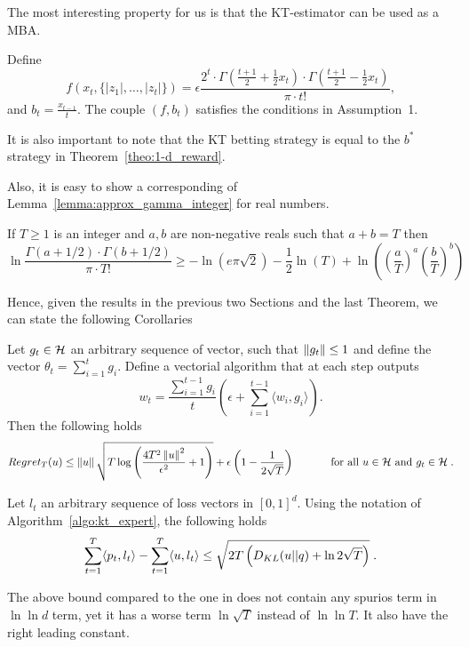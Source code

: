 The most interesting property for us is that the \ac{KT}-estimator can be used as a \ac{MBA}.
\begin{theorem}
\label{theo:kt_is_mba}
Define 
\begin{equation}
\label{eq:kt_potential}
f\left( x_{t}, \{|z_1|, \ldots, |z_{t}|\}\right) 
= \epsilon  \frac{2^t \cdot \Gamma \left(\frac{t+1}{2} + \frac{1}{2} x_{t} \right) \cdot \Gamma \left(\frac{t+1}{2} - \frac{1}{2} x_{t} \right)}{\pi \cdot t!}, 
\end{equation}
and $b_t= \frac{x_{t-1}}{t}$.
The couple $(f,b_t)$ satisfies the conditions in Assumption~1.
\end{theorem}
It is also important to note that the \ac{KT} betting strategy is equal to the $b^*$ strategy in Theorem~\ref{theo:1-d_reward}.

Also, it is easy to show a corresponding of Lemma~\ref{lemma:approx_gamma_integer} for real numbers.
\begin{lemma}
\label{lemma:approx_gamma_real}
If $T\geq1$ is an integer and $a,b$ are non-negative reals such that $a +
b = T$ then
$$
\ln \frac{\Gamma(a + 1/2) \cdot \Gamma(b + 1/2)}{\pi \cdot T!} 
\geq - \ln(e \pi \sqrt{2}) -\frac{1}{2} \ln(T) +\ln \left(\left( \frac{a}{T} \right)^a \left( \frac{b}{T} \right)^b\right) 
$$
\end{lemma}

Hence, given the results in the previous two Sections and the last Theorem, we can state the following Corollaries
\begin{cor}
  \label{cor:kt_hilbert}
  Let $g_t \in \mathcal{H}$ an arbitrary sequence of vector, such that $\left\|{g_t}\right\| \leq 1$ and define the vector $\theta_t=\sum_{i=1}^{t} g_i$.
  Define a vectorial algorithm that at each step outputs 
  \[
  w_t = \frac{\sum_{i=1}^{t-1} g_i}{t} \left(\epsilon+ \sum_{i=1}^{t-1} \langle w_i, g_i \rangle \right).
  \]
  Then the following holds
  \[
    Regret_T(u) \leq \left\|{u}\right\| \sqrt{T \log \left(\frac{4 T^2 \left\|{u}\right\|^2}{\epsilon^2} +1 \right)} +\epsilon\left(1-\frac{1}{2\sqrt{T}}\right) \quad \quad \quad \textnormal{ for all } u \in \mathcal{H} \textnormal{ and } g_t \in \mathcal{H} \; .
  \]
\end{cor}

\begin{cor}
\label{cor:kt_expert}
Let $l_t$ an arbitrary sequence of loss vectors in $[0,1]^d$. Using the notation of Algorithm~\ref{algo:kt_expert}, the following holds
\[
\sum_{t=1}^T \langle p_t, l_t\rangle -\sum_{t=1}^T \langle u , l_t\rangle 
\leq \sqrt{2 T \left(D_{KL}(u||q) +\ln 2\sqrt{T}\right)} \; .
\]
\end{cor}

The above bound compared to the one in \citet{LuoS15} does not contain any spurios term in $\ln \ln d$ term, yet it has a worse term $\ln \sqrt{T}$ instead of $\ln \ln T$. It also have the right leading constant.